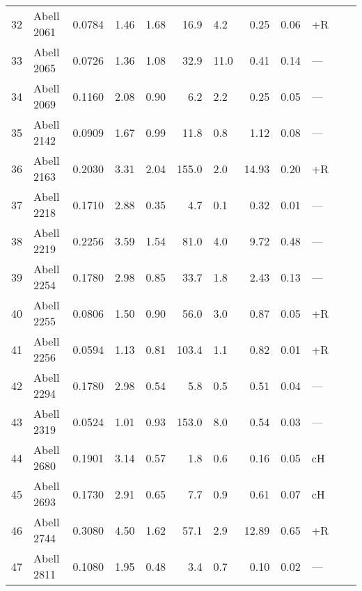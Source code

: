\begin{ThreePartTable}
\begin{longtable}{clcccr@{$\,\pm\,$}lr@{$\,\pm\,$}llll}
32 & Abell 2061            & 0.0784 & 1.46 & 1.68 &  16.9 &  4.2          &  0.25 &  0.06 & +R  & \parencite{farnsworth2013}  \\
33 & Abell 2065            & 0.0726 & 1.36 & 1.08 &  32.9 & 11.0          &  0.41 &  0.14 & --- & \parencite{farnsworth2013}  \\
34 & Abell 2069            & 0.1160 & 2.08 & 0.90 &   6.2 &  2.2\tnote{d} &  0.25 &  0.05 & --- & \parencite{drabent2015}  \\
35 & Abell 2142            & 0.0909 & 1.67 & 0.99 &  11.8 &  0.8          &  1.12 &  0.08 & --- & \parencite{venturi2017}  \\
36 & Abell 2163            & 0.2030 & 3.31 & 2.04 & 155.0 &  2.0          & 14.93 &  0.20 & +R  & \parencite{feretti2001}  \\
37 & Abell 2218            & 0.1710 & 2.88 & 0.35 &   4.7 &  0.1          &  0.32 &  0.01 & --- & \parencite{giovannini2000}  \\
38 & Abell 2219            & 0.2256 & 3.59 & 1.54 &  81.0 &  4.0          &  9.72 &  0.48 & --- & \parencite{bacchi2003}  \\
39 & Abell 2254            & 0.1780 & 2.98 & 0.85 &  33.7 &  1.8          &  2.43 &  0.13 & --- & \parencite{govoni2001}  \\
40 & Abell 2255            & 0.0806 & 1.50 & 0.90 &  56.0 &  3.0          &  0.87 &  0.05 & +R  & \parencite{govoni2005}  \\
41 & Abell 2256            & 0.0594 & 1.13 & 0.81 & 103.4 &  1.1          &  0.82 &  0.01 & +R  & \parencite{clarke2006}  \\
42 & Abell 2294            & 0.1780 & 2.98 & 0.54 &   5.8 &  0.5          &  0.51 &  0.04 & --- & \parencite{giovannini2009}  \\
43 & Abell 2319            & 0.0524 & 1.01 & 0.93 & 153.0 &  8.0          &  0.54 &  0.03 & --- & \parencite{feretti1997}  \\
44 & Abell 2680            & 0.1901 & 3.14 & 0.57 &   1.8 &  0.6\tnote{e} &  0.16 &  0.05 & cH  & \parencite{duchesne2017}  \\
45 & Abell 2693            & 0.1730 & 2.91 & 0.65 &   7.7 &  0.9\tnote{f} &  0.61 &  0.07 & cH  & \parencite{duchesne2017}  \\
46 & Abell 2744            & 0.3080 & 4.50 & 1.62 &  57.1 &  2.9          & 12.89 &  0.65 & +R  & \parencite{govoni2001}  \\
47 & Abell 2811            & 0.1080 & 1.95 & 0.48 &   3.4 &  0.7\tnote{g} &  0.10 &  0.02 & --- & \parencite{duchesne2017}  \\

\end{longtable}
\end{ThreePartTable}
